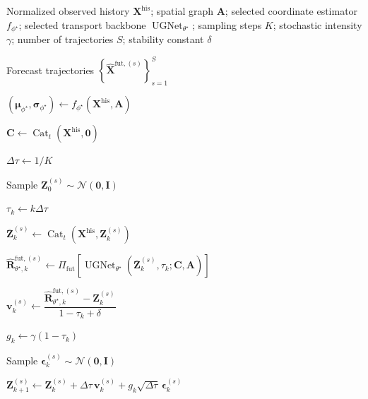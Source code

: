 \documentclass[sigconf, anonymous, review]{acmart}
\begin{document}
\begin{algorithm}[h]
\caption{Stochastic Inference of FAST-STG}
\label{alg:inference}
\begin{algorithmic}[1]

\Require Normalized observed history
$\mathbf{X}^{\mathrm{his}}$;
spatial graph $\mathbf{A}$;
selected coordinate estimator $f_{\phi^{\star}}$;
selected transport backbone
$\operatorname{UGNet}_{\theta^{\star}}$;
sampling steps $K$;
stochastic intensity $\gamma$;
number of trajectories $S$;
stability constant $\delta$

\Ensure Forecast trajectories
$\left\{
\widehat{\mathbf{X}}^{\mathrm{fut},(s)}
\right\}_{s=1}^{S}$

\State $(\boldsymbol{\mu}_{\phi^{\star}},
\boldsymbol{\sigma}_{\phi^{\star}})
\gets
f_{\phi^{\star}}
\left(
\mathbf{X}^{\mathrm{his}},
\mathbf{A}
\right)$

\State $\mathbf{C}
\gets
\operatorname{Cat}_{t}
\left(
\mathbf{X}^{\mathrm{his}},
\mathbf{0}
\right)$

\State $\Delta\tau\gets 1/K$


    \State Sample
    $\mathbf{Z}_{0}^{(s)}
    \sim
    \mathcal{N}(\mathbf{0},\mathbf{I})$


        \State $\tau_k\gets k\Delta\tau$

        \State $\overline{\mathbf{Z}}_{k}^{(s)}
        \gets
        \operatorname{Cat}_{t}
        \left(
        \mathbf{X}^{\mathrm{his}},
        \mathbf{Z}_{k}^{(s)}
        \right)$

        \State $\widehat{\mathbf{R}}_{\theta^{\star},k}^{\mathrm{fut},(s)}
        \gets
        \Pi_{\mathrm{fut}}
        \left[
        \operatorname{UGNet}_{\theta^{\star}}
        \left(
        \overline{\mathbf{Z}}_{k}^{(s)},
        \tau_k;
        \mathbf{C},
        \mathbf{A}
        \right)
        \right]$

        \State $\mathbf{v}_{k}^{(s)}
        \gets
        \dfrac{
        \widehat{\mathbf{R}}_{\theta^{\star},k}^{\mathrm{fut},(s)}
        -
        \mathbf{Z}_{k}^{(s)}
        }{
        1-\tau_k+\delta
        }$

        \State $g_k\gets\gamma(1-\tau_k)$

        \State Sample
        $\boldsymbol{\epsilon}_{k}^{(s)}
        \sim
        \mathcal{N}(\mathbf{0},\mathbf{I})$

        \State $\mathbf{Z}_{k+1}^{(s)}
        \gets
        \mathbf{Z}_{k}^{(s)}
        +
        \Delta\tau\,
        \mathbf{v}_{k}^{(s)}
        +
        g_k\sqrt{\Delta\tau}\,
        \boldsymbol{\epsilon}_{k}^{(s)}$


\end{algorithmic}
\end{algorithm}
\end{document}
